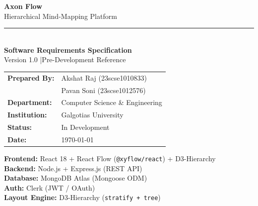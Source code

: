 \documentclass[12pt, a4paper]{article}
\begin{document}
\thispagestyle{empty}

\vspace*{1.5cm}
\begin{center}
  {\fontsize{38}{42}\selectfont\bfseries\color{axonpurple} Axon Flow}\\[0.4cm]
  {\Large\color{axondark!70} Hierarchical Mind-Mapping Platform}\\[0.3cm]
  \textcolor{axonpurple!60}{\rule{10cm}{1.5pt}}\\[0.6cm]
  {\LARGE\bfseries Software Requirements Specification}\\[0.2cm]
  {\large Version 1.0 \quad|\quad Pre-Development Reference}
\end{center}

\vspace{1.5cm}
\begin{center}
\begin{tabular}{ll}
  \textbf{Prepared By:}   & Akshat Raj (23scse1010833) \\
                          & Pavan Soni (23scse1012576) \\
  \textbf{Department:}    & Computer Science \& Engineering \\
  \textbf{Institution:}   & Galgotias University \\
  \textbf{Status:}        & In Development \\
  \textbf{Date:}          & \today \\
\end{tabular}
\end{center}

\vspace{2cm}
\begin{center}
\begin{tcolorbox}[colback=axonpurple!8, colframe=axonpurple, width=12cm,
  title=\textbf{Tech Stack}, fonttitle=\bfseries\color{white}, colbacktitle=axonpurple]
  \centering
  \textbf{Frontend:} React 18 + React Flow (\texttt{@xyflow/react}) + D3-Hierarchy\\
  \textbf{Backend:} Node.js + Express.js (REST API)\\
  \textbf{Database:} MongoDB Atlas (Mongoose ODM)\\
  \textbf{Auth:} Clerk (JWT / OAuth)\\
  \textbf{Layout Engine:} D3-Hierarchy (\texttt{stratify + tree})
\end{tcolorbox}
\end{center}

\newpage
\tableofcontents
\newpage
\end{document}
